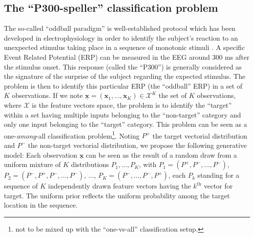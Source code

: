\documentclass[conference]{IEEEtran}
\begin{document}
\subsection{The ``P300-speller'' classification problem}

The so-called ``oddball paradigm'' is well-established protocol which has been developed in electrophysiology 
in order to identify the subject's reaction to an unexpected stimulus taking place 
in a sequence of monotonic stimuli \cite{Farwell88}.
A specific Event Related Potential (ERP) can be measured in the EEG around 300 ms after the stimulus onset.
This response (called the ``P300'') is generally considered as the signature of the surprise of the subject regarding 
the expected stimulus. 
The problem is then to identify this particular
ERP (the ``oddball'' ERP) in a set of $K$ observations. 
If we note $\underline{\mathbf{x}} = (\boldsymbol{x}_1,...,\boldsymbol{x}_K) \in \mathcal{X}^K$ the set of $K$ observations,
where $\mathcal{X}$ is the feature vectors space, 
the problem is to identify the ``target'' 
within a set having multiple inputs belonging to the ``non-target'' category
and only one input belonging to the ``target'' category. 
This problem can be seen as a one-\emph{among}-all classification problem\footnote{not to be mixed up with the ``one-vs-all'' classification setup.}.
Noting $P^+$ the target vectorial distribution and
$P^-$ the non-target vectorial distribution, we propose the following generative model: 
Each observation $\underline{\mathbf{x}}$ can be seen as the result of a random draw from a uniform 
mixture of $K$ distributions $P_1, ..., P_K$,  
with $P_1 = (P^+,P^-,...,P^-)$, $P_2=(P^-,P^+,P^-,...,P^-)$, ..., $P_K=(P^-,...,P^-,P^+)$,
each $P_k$ standing for a sequence of $K$ independently drawn feature vectors having the $k^\text{th}$ vector for target.
The uniform prior reflects the uniform probability among the target location in the sequence.
\end{document}
